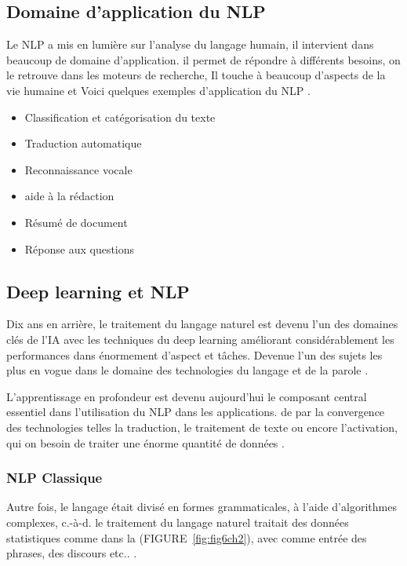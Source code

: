     \subsection{Domaine d'application du NLP}
    \par Le NLP a mis en lumière sur l'analyse du langage humain, il intervient dans beaucoup de domaine d'application. il permet de répondre à différents besoins, on le retrouve dans les moteurs de recherche, Il touche à beaucoup d'aspects de la vie humaine et Voici quelques exemples d'application du NLP \cite{ch2ref8, ch2ref9}. 
    
    \begin{itemize}[label=•] 
    \setlength{\itemsep}{5pt}
        \item Classification et catégorisation du texte
        \item Traduction automatique
        \item Reconnaissance vocale
        \item aide à la rédaction
        \item Résumé de document
        \item Réponse aux questions
    \end{itemize}

    \subsection{Deep learning et NLP}
    \par Dix ans en arrière, le traitement du langage naturel est devenu l'un des domaines clés de l'IA avec les techniques du deep learning améliorant considérablement les performances dans énormement d'aspect et tâches. Devenue l'un des sujets les plus en vogue dans le domaine des technologies du langage et de la parole \cite{ch2ref5}. 
    
    \par L'apprentissage en profondeur est devenu aujourd'hui le composant central essentiel dans l'utilisation du NLP dans les applications. de par la convergence des technologies telles la traduction, le traitement de texte ou encore l'activation, qui on besoin de traiter une énorme quantité de données \cite{ch2ref5}.
    
        \subsubsection{NLP Classique}
        \par Autre fois, le langage était divisé en formes grammaticales, à l'aide d'algorithmes complexes, c.-à-d. le traitement du langage naturel traitait des données statistiques comme dans la (FIGURE~\ref{fig:fig6ch2}), avec comme entrée des phrases, des discours etc.. \cite{ch2ref5}. 
        
